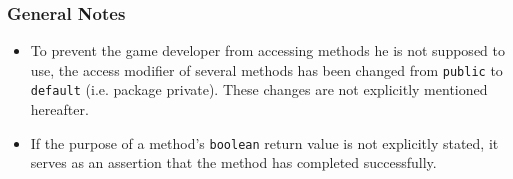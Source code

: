 \subsubsection{General Notes}
\begin{itemize}
\item To prevent the game developer from accessing methods he is not supposed to use, the access modifier of several methods has been
changed from \texttt{public} to \texttt{default} (i.e. package private). These changes are not explicitly mentioned hereafter.
\item If the purpose of a method's \texttt{boolean} return value is not explicitly stated, it serves as an assertion that the method has
completed successfully.
\end{itemize}